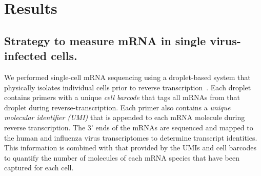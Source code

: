 \documentclass[9pt,lineno]{elife}
\begin{document}
 

\section{Results}

\subsection{Strategy to measure mRNA in single virus-infected cells.}
We performed single-cell mRNA sequencing using a droplet-based system that physically isolates individual cells prior to reverse transcription~\citep{zheng2017massively,Macosko:2015ht,Klein:2015ki}.
Each droplet contains primers with a unique \emph{cell barcode} that tags all mRNAs from that droplet during reverse-transcription.
Each primer also contains a \emph{unique molecular identifier (UMI)} that is appended to each mRNA molecule during reverse transcription.
The 3' ends of the mRNAs are sequenced and mapped to the human and influenza virus transcriptomes to determine transcript identities.
This information is combined with that provided by the UMIs and cell barcodes to quantify the number of molecules of each mRNA species that have been captured for each cell.
\end{document}
